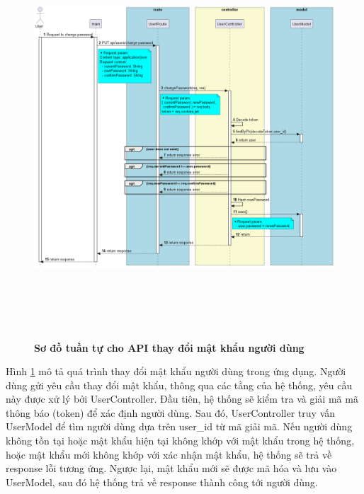 \begin{enumerate}[a)]
\begin{figure}[H]
  \centering
  \includegraphics[width=14cm,height=15cm]{Images/server/sequence/server/changePassword.png}
  \caption[Sơ đồ tuần tự cho API thay đổi mật khẩu người dùng ]{\bfseries \fontsize{12pt}{0pt}
  \selectfont Sơ đồ tuần tự cho API thay đổi mật khẩu người dùng }
  \label{changePassword} %
\end{figure}

Hình \ref{changePassword} mô tả quá trình thay đổi mật khẩu người dùng trong ứng dụng. Người dùng gửi yêu cầu thay đổi mật khẩu, thông qua các tầng của hệ thống, yêu cầu này được xử lý bởi UserController. Đầu tiên, hệ thống sẽ kiểm tra và giải mã mã thông báo (token) để xác định người dùng. Sau đó, UserController truy vấn UserModel để tìm người dùng dựa trên user\_id từ mã giải mã. Nếu người dùng không tồn tại hoặc mật khẩu hiện tại không khớp với mật khẩu trong hệ thống, hoặc mật khẩu mới không khớp với xác nhận mật khẩu, hệ thống sẽ trả về response lỗi tương ứng. Ngược lại, mật khẩu mới sẽ được mã hóa và lưu vào UserModel, sau đó hệ thống trả về response thành công tới người dùng.




\end{enumerate}
